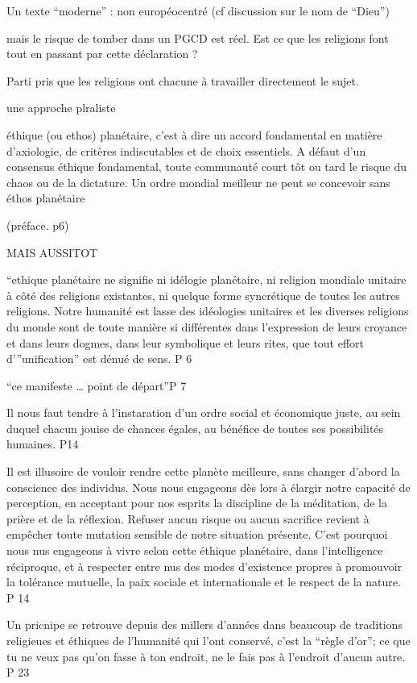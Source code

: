         Un texte “moderne” : non européocentré (cf discussion sur le nom de “Dieu”)

        mais le risque de tomber dans un PGCD est réel. Est ce que les religions font tout en passant par cette déclaration ?

        Parti pris que les religions ont chacune à travailler directement le sujet.

        une approche plraliste
\begin{singlequote}
éthique (ou ethos) planétaire, c’est à dire un accord fondamental en matière d’axiologie, de critères indiscutables et de choix essentiels. A défaut d’un consensus éthique fondamental, toute communauté court tôt ou tard le risque du chaos ou de la dictature.  Un ordre mondial meilleur ne peut se concevoir sans éthos planétaire

        (préface. p6)

\end{singlequote}

        MAIS AUSSITOT
\begin{singlequote}
“ethique planétaire ne signifie ni idélogie planétaire, ni religion mondiale unitaire à côté des religions existantes, ni quelque forme syncrétique de toutes les autres religions. Notre humanité est lasse des idéologies unitaires et les diverses religions du monde sont de toute manière si différentes dans l’expression de leurs croyance et dans leurs dogmes, dans leur symbolique et leurs rites, que tout effort d’”unification” est dénué de sens. P 6

\end{singlequote}


“ce manifeste … point de départ”P 7

\begin{singlequote}

Il nous faut tendre à l’instaration d’un ordre social et économique juste, au sein duquel chacun jouise de chances égales, au bénéfice de toutes ses possibilités humaines. P14

        Il est illusoire de vouloir rendre cette planète meilleure, sans changer d’abord la conscience des individus. Nous nous engageons dès lors à élargir notre capacité de perception, en acceptant pour nos esprits la discipline de la méditation, de la prière et de la réflexion. Refuser aucun risque ou aucun sacrifice revient à empêcher toute mutation sensible de notre situation présente. C’est pourquoi nous nus engageons à vivre selon cette éthique planétaire, dans l’intelligence réciproque, et à respecter entre nus des modes d’existence propres à promouvoir la tolérance mutuelle, la paix sociale et internationale et le respect de la nature. P 14

        Un pricnipe se retrouve depuis des millers d’années dans beaucoup de traditions religieues et éthiques de l’humanité qui l’ont conservé, c’est la “règle d’or”; ce que tu ne veux pas qu’on fasse à ton endroit, ne le fais pas à l’endroit d’aucun autre. P 23
\end{singlequote}
        
